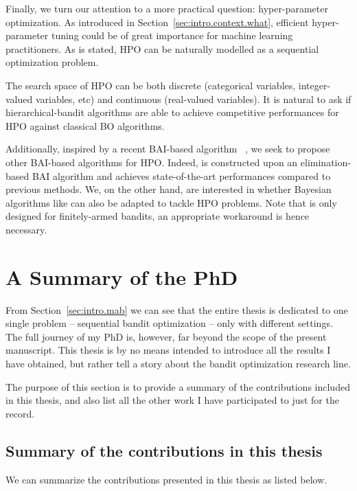 Finally, we turn our attention to a more practical question: hyper-parameter optimization. As introduced in Section~\ref{sec:intro.context.what}, efficient hyper-parameter tuning could be of great importance for machine learning practitioners. As is stated, HPO can be naturally modelled as a sequential optimization problem.

The search space of HPO can be both discrete (categorical variables, integer-valued variables, etc) and continuous (real-valued variables). It is natural to ask if hierarchical-bandit algorithms are able to achieve competitive performances for HPO against classical BO algorithms.

Additionally, inspired by a recent BAI-based algorithm \Hyperband~\citep{li2017hyperband}, we seek to propose other BAI-based algorithms for HPO. Indeed, \Hyperband is constructed upon an elimination-based BAI algorithm and achieves state-of-the-art performances compared to previous methods. We, on the other hand, are interested in whether Bayesian algorithms like \TTTS can also be adapted to tackle HPO problems. Note that \TTTS is only designed for \gls{finitely-armed bandits}, an appropriate workaround is hence necessary.

\section{A Summary of the PhD}\label{sec:intro.contributions}

From Section~\ref{sec:intro.mab} we can see that the entire thesis is dedicated to one single problem -- sequential bandit optimization -- only with different settings. The full journey of my PhD is, however, far beyond the scope of the present manuscript. This thesis is by no means intended to introduce all the results I have obtained, but rather tell a story about the bandit optimization research line. 

The purpose of this section is to provide a summary of the contributions included in this thesis, and also list all the other work I have participated to just for the record.

\subsection{Summary of the contributions in this thesis}\label{sec:intro.contributions.summary}

We can summarize the contributions presented in this thesis as listed below.

